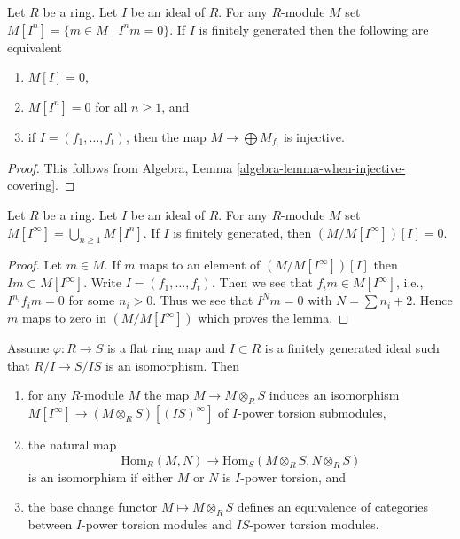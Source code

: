 \begin{lemma}
\label{lemma-torsion-free}
Let $R$ be a ring. Let $I$ be an ideal of $R$.
For any $R$-module $M$ set $M[I^n] = \{m \in M \mid I^nm = 0\}$.
If $I$ is finitely generated then the following are equivalent
\begin{enumerate}
\item $M[I] = 0$,
\item $M[I^n] = 0$ for all $n \geq 1$, and
\item if $I = (f_1, \ldots, f_t)$, then the map
$M \to \bigoplus M_{f_i}$ is injective.
\end{enumerate}
\end{lemma}

\begin{proof}
This follows from
Algebra, Lemma \ref{algebra-lemma-when-injective-covering}.
\end{proof}

\begin{lemma}
\label{lemma-divide-by-torsion}
Let $R$ be a ring. Let $I$ be an ideal of $R$. For any $R$-module $M$
set $M[I^\infty] = \bigcup_{n \geq 1} M[I^n]$.
If $I$ is finitely generated, then $(M/M[I^\infty])[I] = 0$.
\end{lemma}

\begin{proof}
Let $m \in M$. If $m$ maps to an element of $(M/M[I^\infty])[I]$
then $Im \subset M[I^\infty]$.
Write $I = (f_1, \ldots, f_t)$. Then we see that
$f_i m \in M[I^\infty]$, i.e., $I^{n_i}f_i m = 0$ for some $n_i > 0$.
Thus we see that $I^Nm = 0$ with $N = \sum n_i + 2$.
Hence $m$ maps to zero in $(M/M[I^\infty])$ which proves the lemma.
\end{proof}

\begin{lemma}
\label{lemma-neighbourhood-equivalence}
Assume $\varphi : R \to S$ is a flat ring map and $I \subset R$ is a
finitely generated ideal such that $R/I \to S/IS$ is an isomorphism. Then
\begin{enumerate}
\item for any $R$-module $M$ the map $M \to M \otimes_R S$ induces
an isomorphism
$M[I^\infty] \to (M \otimes_R S)[(IS)^\infty]$ of $I$-power
torsion submodules,
\item the natural map
$$
\text{Hom}_R(M, N) \longrightarrow \text{Hom}_S(M \otimes_R S, N \otimes_R S)
$$
is an isomorphism if either $M$ or $N$ is $I$-power torsion, and
\item the base change functor $M \mapsto M \otimes_R S$ defines an
equivalence of categories between $I$-power torsion modules
and $IS$-power torsion modules.
\end{enumerate}
\end{lemma}

